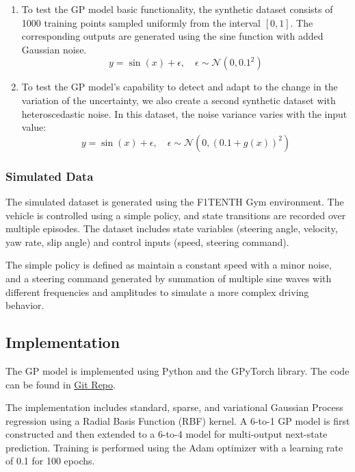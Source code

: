 \documentclass[12pt]{article}
\begin{document}
\begin{enumerate}
    \item To test the GP model basic functionality, the synthetic dataset consists of 1000 training points sampled uniformly from the interval $[0, 1]$. The corresponding outputs are generated using the sine function with added Gaussian noise. 
    \[
        y = \sin(x) + \epsilon, \quad \epsilon \sim \mathcal{N}(0, 0.1^2)
    \]

    \item To test the GP model's capability to detect and adapt to the change in the variation of the uncertainty, we also create a second synthetic dataset with heteroscedastic noise. In this dataset, the noise variance varies with the input value:
    \[
        y = \sin(x) + \epsilon, \quad \epsilon \sim \mathcal{N}(0, (0.1 + g(x))^2)
    \]
\end{enumerate}

\subsubsection{Simulated Data}

The simulated dataset is generated using the F1TENTH Gym environment. The vehicle is controlled using a simple policy, and state transitions are recorded over multiple episodes. The dataset includes state variables (steering angle, velocity, yaw rate, slip angle) and control inputs (speed, steering command).

The simple policy is defined as maintain a constant speed with a minor noise, and a steering command generated by summation of multiple sine waves with different frequencies and amplitudes to simulate a more complex driving behavior.




\subsection{Implementation}
The GP model is implemented using Python and the GPyTorch library. The code can be found in \href{https://github.com/SpectrumMu/f110-gp4dyn}{Git Repo}.

The implementation includes standard, sparse, and variational Gaussian Process  regression using a Radial Basis Function (RBF) kernel. A 6-to-1 GP model is first constructed and then extended to a 6-to-4 model for multi-output next-state prediction. Training is performed using the Adam optimizer with a learning rate of 0.1 for 100 epochs.
\end{document}
